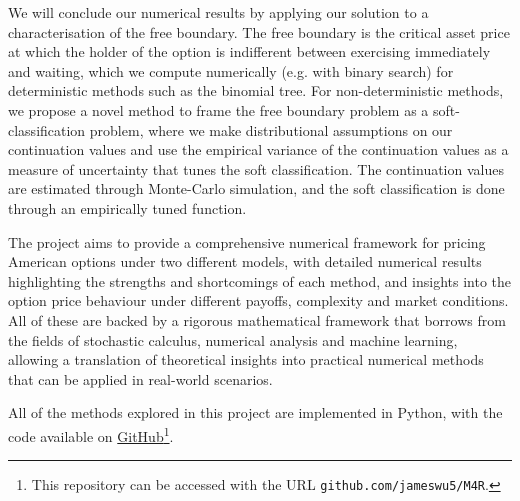 We will conclude our numerical results by applying our solution to a characterisation of the free boundary. The free boundary is the critical asset price at which the holder of the option is indifferent between exercising immediately and waiting, which we compute numerically (e.g. with binary search) for deterministic methods such as the binomial tree. For non-deterministic methods, we propose a novel method to frame the free boundary problem as a soft-classification problem, where we make distributional assumptions on our continuation values and use the empirical variance of the continuation values as a measure of uncertainty that tunes the soft classification. The continuation values are estimated through Monte-Carlo simulation, and the soft classification is done through an empirically tuned function.

The project aims to provide a comprehensive numerical framework for pricing American options under two different models, with detailed numerical results highlighting the strengths and shortcomings of each method, and insights into the option price behaviour under different payoffs, complexity and market conditions. All of these are backed by a rigorous mathematical framework that borrows from the fields of stochastic calculus, numerical analysis and machine learning, allowing a translation of theoretical insights into practical numerical methods that can be applied in real-world scenarios.

All of the methods explored in this project are implemented in Python, with the code available on \href{https://github.com/jameswu5/M4R}{GitHub}\footnote{This repository can be accessed with the URL \texttt{github.com/jameswu5/M4R}.}.
